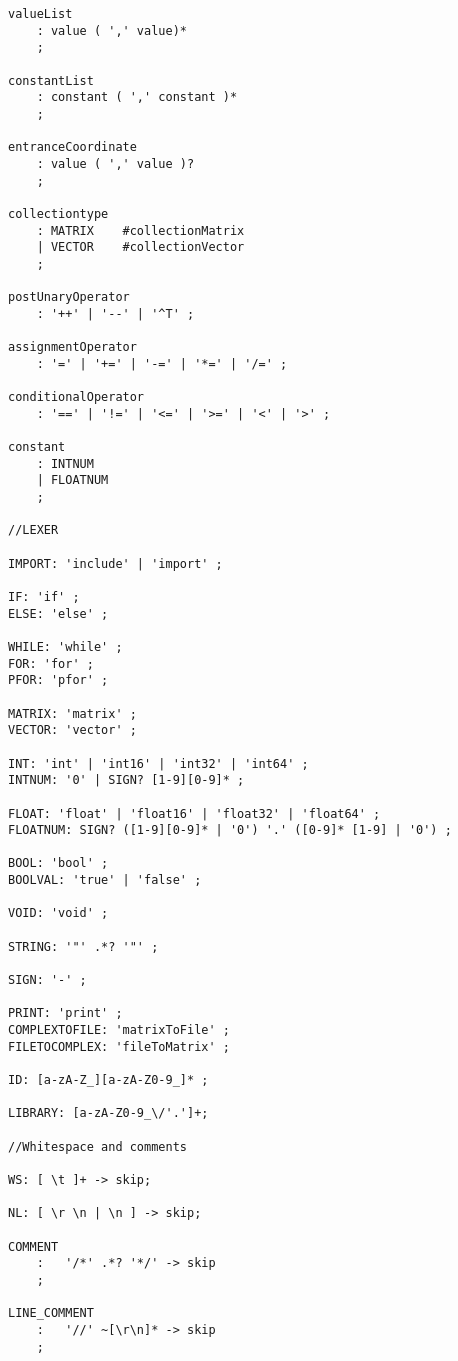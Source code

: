 \begin{lstlisting}[caption={\acrshort{cfg} and Lexing rules},frame=tlrb,numbers=none]
valueList
    : value ( ',' value)*
    ;

constantList
    : constant ( ',' constant )*
    ;

entranceCoordinate
    : value ( ',' value )?
    ;

collectiontype
    : MATRIX    #collectionMatrix
    | VECTOR    #collectionVector
    ;

postUnaryOperator 
    : '++' | '--' | '^T' ;

assignmentOperator
    : '=' | '+=' | '-=' | '*=' | '/=' ;

conditionalOperator
    : '==' | '!=' | '<=' | '>=' | '<' | '>' ;

constant
    : INTNUM  
    | FLOATNUM 
    ;

//LEXER  

IMPORT: 'include' | 'import' ;  
  
IF: 'if' ;
ELSE: 'else' ;

WHILE: 'while' ;
FOR: 'for' ;   
PFOR: 'pfor' ;

MATRIX: 'matrix' ;
VECTOR: 'vector' ;

INT: 'int' | 'int16' | 'int32' | 'int64' ;
INTNUM: '0' | SIGN? [1-9][0-9]* ;

FLOAT: 'float' | 'float16' | 'float32' | 'float64' ;  
FLOATNUM: SIGN? ([1-9][0-9]* | '0') '.' ([0-9]* [1-9] | '0') ;

BOOL: 'bool' ;
BOOLVAL: 'true' | 'false' ;

VOID: 'void' ;

STRING: '"' .*? '"' ;

SIGN: '-' ;   

PRINT: 'print' ;
COMPLEXTOFILE: 'matrixToFile' ;
FILETOCOMPLEX: 'fileToMatrix' ;

ID: [a-zA-Z_][a-zA-Z0-9_]* ;    

LIBRARY: [a-zA-Z0-9_\/'.']+;

//Whitespace and comments

WS: [ \t ]+ -> skip;

NL: [ \r \n | \n ] -> skip;

COMMENT
    :   '/*' .*? '*/' -> skip
    ;

LINE_COMMENT
    :   '//' ~[\r\n]* -> skip
    ;
                                                
\end{lstlisting}